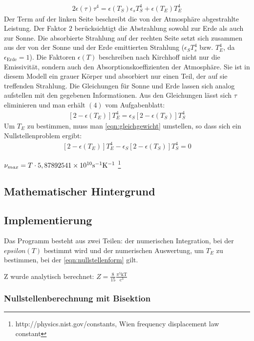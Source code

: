 \documentclass[10pt,a4paper]{article}
\begin{document}
\begin{align}
2\epsilon(\tau)\tau^4=\epsilon(T_S)\epsilon_s T_S^4+\epsilon(T_E)T_E^4
\end{align}
Der Term auf der linken Seite beschreibt die von der Atmosphäre abgestrahlte Leistung. Der Faktor $2$ berücksichtigt die Abstrahlung sowohl zur Erde als auch zur Sonne. Die absorbierte Strahlung auf der rechten Seite setzt sich zusammen aus der von der Sonne und der Erde emittierten Strahlung ($\epsilon_S T_s^4$ bzw. $T_E^4$, da $\epsilon_{\mathrm{Erde}}=1$). Die Faktoren $\epsilon(T)$ beschreiben nach Kirchhoff nicht nur die Emissivität, sondern auch den Absorptionskoeffizienten der Atmosphäre. Sie ist in diesem Modell ein grauer Körper und absorbiert nur einen Teil, der auf sie treffenden Strahlung. Die Gleichungen für Sonne und Erde lassen sich analog aufstellen mit den gegebenen Informationen.
Aus den Gleichungen lässt sich $\tau$ eliminieren und man erhält $(4)$ vom Aufgabenblatt:
\begin{align}
\left[2-\epsilon(T_E)\right]T_E^4=\epsilon_S\left[2-\epsilon(T_S)\right]T_S^4
\label{eqn:gleichgewicht}
\end{align}
Um $T_E$ zu bestimmen, muss man \ref{eqn:gleichgewicht} umstellen, so dass sich ein Nullstellenproblem ergibt:
\begin{align}
\left[2-\epsilon(T_E)\right]T_E^4-\epsilon_S\left[2-\epsilon(T_S)\right]T_S^4=0
\label{eqn:nullstellenform}
\end{align}


$\nu_{max}=T\cdot 5,8789254\num{1E10}\si{\per\second}\si{\per\kelvin}$ \footnote{http://physics.nist.gov/constants, Wien frequency displacement law constant}

\subsection{Mathematischer Hintergrund}

\subsection{Implementierung}

Das Programm besteht aus zwei Teilen: der numerischen Integration, bei der $epsilon(T)$ bestimmt wird und der numerischen Auswertung, um $T_E$ zu bestimmen, bei der \ref{eqn:nullstellenform} gilt.

Z wurde analytisch berechnet: $Z=\frac{8}{15}\frac{\pi^5 \mathrm{kT}}{\mathrm{c}^3}$

\subsubsection{Nullstellenberechnung mit Bisektion}
\end{document}
